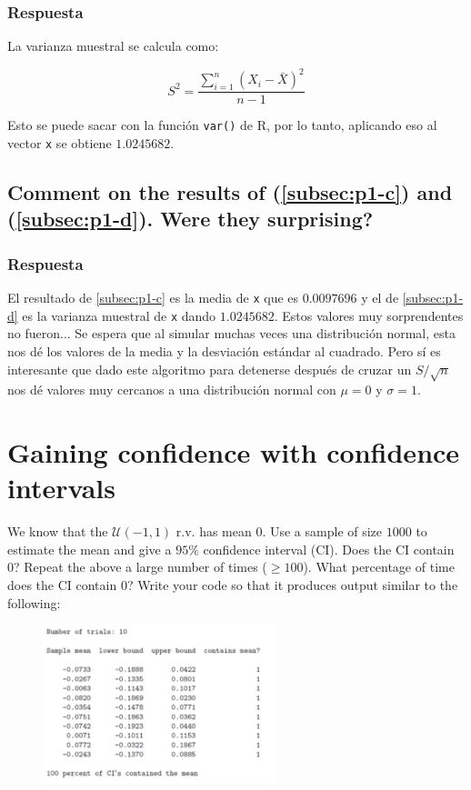 \documentclass[12pt]{article}\usepackage[]{graphicx}\usepackage[]{xcolor}
\begin{document}
\subsubsection{Respuesta}

La varianza muestral se calcula como:

\[
S^{2} = \frac{\sum_{i=1}^{n} (X_{i} - \bar{X})^{2}}{n-1}
\]

Esto se puede sacar con la función \lstinline|var()| de \textsf{R}, por lo tanto, aplicando eso al vector \lstinline|x| se obtiene $1.0245682$.



\subsection{Comment on the results of (\ref{subsec:p1-c}) and (\ref{subsec:p1-d}). Were they surprising?}
\label{subsec:p1-e}

\subsubsection{Respuesta}

El resultado de \ref{subsec:p1-c} es la media de \lstinline|x| que es $0.0097696$ y el de \ref{subsec:p1-d} es la varianza muestral de \lstinline|x| dando $1.0245682$. Estos valores muy sorprendentes no fueron... Se espera que al simular muchas veces una distribución normal, esta nos dé los valores de la media y la desviación estándar al cuadrado. Pero sí es interesante que dado este algoritmo para detenerse después de cruzar un $S / \sqrt{n}$ nos dé valores muy cercanos a una distribución normal con $\mu = 0$ y $\sigma = 1$.


\newpage

\section{Gaining confidence with confidence intervals}

We know that the $\mathcal{U}(-1, 1)$ r.v. has mean 0. Use a sample of size $1000$ to estimate the mean and give a $95\%$ confidence interval (CI). Does the CI contain 0? Repeat the above a large number of times ($\geq  100$). What percentage of time does the CI contain 0? Write your code so that it produces output similar to the following:

\begin{figure}[ht]
  \centering
  \includegraphics[width=0.6\textwidth]{img/Punto2.png}
\end{figure}
\end{document}
